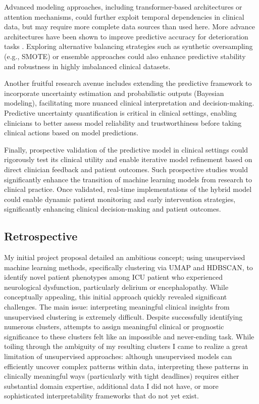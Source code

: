 \documentclass[conference]{IEEEtran}
\begin{document}
Advanced modeling approaches, including transformer-based architectures or attention mechanisms, could further exploit temporal dependencies in clinical data, but may require more complete data sources than used here. More advance architectures have been shown to improve predictive accuracy for deterioration tasks \cite{vaswani2017attention, song2018attend}. Exploring alternative balancing strategies such as synthetic oversampling (e.g., SMOTE) or ensemble approaches could also enhance predictive stability and robustness in highly imbalanced clinical datasets.

Another fruitful research avenue includes extending the predictive framework to incorporate uncertainty estimation and probabilistic outputs (Bayesian modeling), facilitating more nuanced clinical interpretation and decision-making. Predictive uncertainty quantification is critical in clinical settings, enabling clinicians to better assess model reliability and trustworthiness before taking clinical actions based on model predictions.

Finally, prospective validation of the predictive model in clinical settings could rigorously test its clinical utility and enable iterative model refinement based on direct clinician feedback and patient outcomes. Such prospective studies would significantly enhance the transition of machine learning models from research to clinical practice. Once validated, real-time implementations of the hybrid model could enable dynamic patient monitoring and early intervention strategies, significantly enhancing clinical decision-making and patient outcomes.

\subsection{Retrospective}

My initial project proposal detailed an ambitious concept; using unsupervised machine learning methods, specifically clustering via UMAP and HDBSCAN, to identify novel patient phenotypes among ICU patient who experienced neurological dysfunction, particularly delirium or encephalopathy. While conceptually appealing, this initial approach quickly revealed significant challenges. The main issue: interpreting meaningful clinical insights from unsupervised clustering is extremely difficult. Despite successfully identifying numerous clusters, attempts to assign meaningful clinical or prognostic significance to these clusters felt like an impossible and never-ending task. While toiling through the ambiguity of my resulting clusters I came to realize a great limitation of unsupervised approaches: although unsupervised models can efficiently uncover complex patterns within data, interpreting these patterns in clinically meaningful ways (particularly with tight deadlines) requires either substantial domain expertise, additional data I did not have, or more sophisticated interpretability frameworks that do not yet exist.
\end{document}
